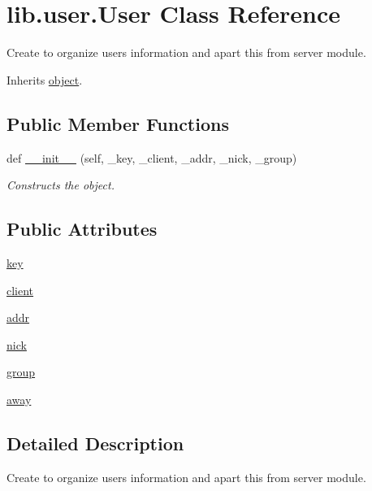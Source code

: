 \hypertarget{classlib_1_1user_1_1_user}{}\section{lib.\+user.\+User Class Reference}
\label{classlib_1_1user_1_1_user}


Create to organize users information and apart this from server module.  




Inherits \hyperlink{classobject}{object}.

\subsection*{Public Member Functions}
\begin{DoxyCompactItemize}
\item 
def \hyperlink{classlib_1_1user_1_1_user_a9462da2b2e976309b4c50cdc83543f18}{\+\_\+\+\_\+init\+\_\+\+\_\+} (self, \+\_\+key, \+\_\+client, \+\_\+addr, \+\_\+nick, \+\_\+group)
\begin{DoxyCompactList}\small\item\em Constructs the object. \end{DoxyCompactList}\end{DoxyCompactItemize}
\subsection*{Public Attributes}
\begin{DoxyCompactItemize}
\item 
\hyperlink{classlib_1_1user_1_1_user_a357be6a34d783cd35fc3dc33aa24a528}{key}
\item 
\hyperlink{classlib_1_1user_1_1_user_a2a6f2d3517eedf2685aaae828e24a220}{client}
\item 
\hyperlink{classlib_1_1user_1_1_user_aae774ceeb015a24d3146d846fac2fa29}{addr}
\item 
\hyperlink{classlib_1_1user_1_1_user_a8215952f8dbb5b653b428765e5b55dec}{nick}
\item 
\hyperlink{classlib_1_1user_1_1_user_aaa56c9aaaa7cf86cd79c7229787bfd3f}{group}
\item 
\hyperlink{classlib_1_1user_1_1_user_a04b4c9794378737a3192ceb1cfdfaa88}{away}
\end{DoxyCompactItemize}


\subsection{Detailed Description}
Create to organize users information and apart this from server module. 

